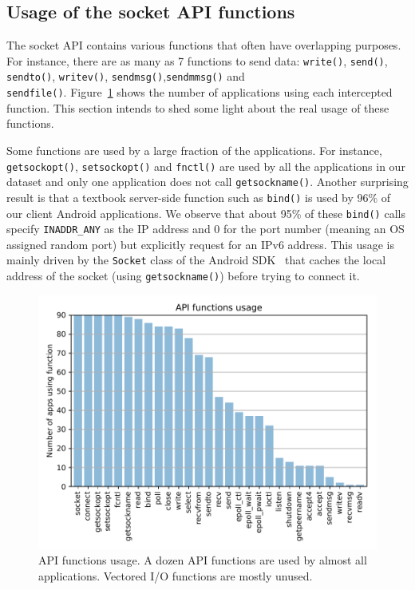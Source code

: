 \subsection{Usage of the socket API functions}

The socket API contains various functions that often have overlapping
purposes. For instance, there are as many as 7 functions to send data:
\texttt{write()}, \texttt{send()}, \texttt{sendto()}, \texttt{writev()},
\texttt{sendmsg()},\texttt{sendmmsg()} and\\\texttt{sendfile()}.
Figure~\ref{fig:functions_usage} shows the number of applications using
each intercepted function. This section intends to
shed some light about the real usage of these functions.

Some functions are used by a large fraction of the applications. For instance,
\texttt{getsockopt()}, \texttt{setsockopt()} and \texttt{fnctl()}
are used by all the applications in our dataset and only one
application does not call \texttt{get\-sock\-name()}. Another surprising result
is that a textbook server-side function such as
\texttt{bind()} is used by 96\% of our client Android
applications.  We observe that about 95\% of
these \texttt{bind()} calls specify \texttt{INADDR\_ANY} as the IP address and
0 for the port number (meaning an OS assigned random port) but explicitly request
for an IPv6 address. This usage is mainly driven by the \texttt{Socket} class
of the Android SDK~\cite{aosp_socket} that caches the local address of the
socket (using \texttt{get\-sock\-name()}) before trying to connect it.

\begin{figure}
\centering
\includegraphics[width=\columnwidth]{figures/functions_bars}
\caption{API functions usage. \textmd{A dozen API functions are used by almost
all applications. Vectored I/O functions are mostly unused.}}
\label{fig:functions_usage}
\end{figure}

